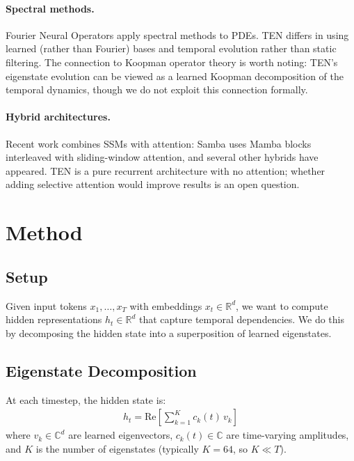 \documentclass{article}
\begin{document}
\paragraph{Spectral methods.}
Fourier Neural Operators \cite{li2021fourier} apply spectral methods to PDEs. TEN differs in using learned (rather than Fourier) bases and temporal evolution rather than static filtering. The connection to Koopman operator theory \cite{brunton2022modern} is worth noting: TEN's eigenstate evolution can be viewed as a learned Koopman decomposition of the temporal dynamics, though we do not exploit this connection formally.

\paragraph{Hybrid architectures.}
Recent work combines SSMs with attention: Samba uses Mamba blocks interleaved with sliding-window attention, and several other hybrids have appeared. TEN is a pure recurrent architecture with no attention; whether adding selective attention would improve results is an open question.


\section{Method}
\label{sec:method}

\subsection{Setup}

Given input tokens $x_1, \ldots, x_T$ with embeddings $x_t \in \mathbb{R}^d$, we want to compute hidden representations $h_t \in \mathbb{R}^d$ that capture temporal dependencies. We do this by decomposing the hidden state into a superposition of learned eigenstates.

\subsection{Eigenstate Decomposition}

At each timestep, the hidden state is:
\begin{align}
h_t = \text{Re}\left[\sum_{k=1}^K c_k(t) \, v_k\right]
\end{align}
where $v_k \in \mathbb{C}^d$ are learned eigenvectors, $c_k(t) \in \mathbb{C}$ are time-varying amplitudes, and $K$ is the number of eigenstates (typically $K = 64$, so $K \ll T$).
\end{document}
